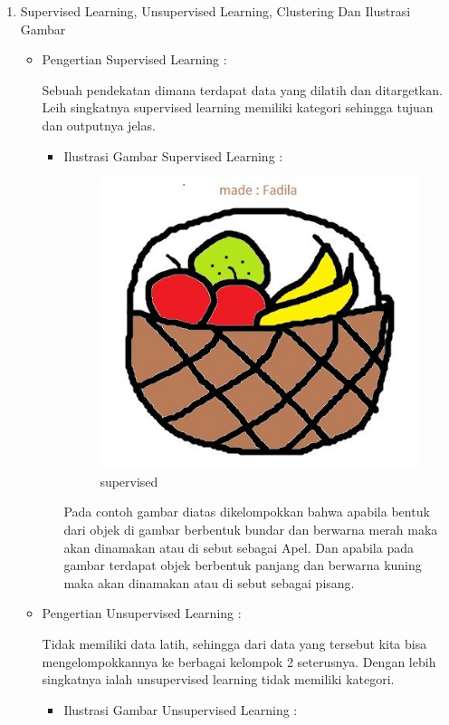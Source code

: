 \begin{enumerate}
\begin{itemize}
\par
\end{itemize}
\item Supervised Learning, Unsupervised Learning, Clustering Dan Ilustrasi Gambar
\begin{itemize}
\item Pengertian Supervised Learning :
\par Sebuah pendekatan dimana terdapat data yang dilatih dan ditargetkan. Leih singkatnya supervised learning memiliki kategori sehingga tujuan dan outputnya jelas.
\begin{itemize}
\par
\item Ilustrasi Gambar Supervised Learning :

\begin{figure}[ht]
\centering
\includegraphics[scale=0.4]{figures/supervised1.jpg}
\caption{supervised}
\label{contoh}
\end{figure}


\par Pada contoh gambar diatas dikelompokkan bahwa apabila bentuk dari objek di gambar berbentuk bundar dan berwarna merah maka akan dinamakan atau di sebut sebagai Apel. Dan apabila pada gambar terdapat objek berbentuk panjang dan berwarna kuning maka akan dinamakan atau di sebut sebagai pisang.
\par
\end{itemize}

\par
\item Pengertian Unsupervised Learning :
\par Tidak memiliki data latih, sehingga dari data yang tersebut kita bisa mengelompokkannya ke berbagai kelompok 2 seterusnya. Dengan lebih singkatnya ialah unsupervised learning tidak memiliki kategori.
\par
\par
\begin{itemize}
\item Ilustrasi Gambar Unsupervised Learning :


\end{itemize}
\end{itemize}
\end{enumerate}

